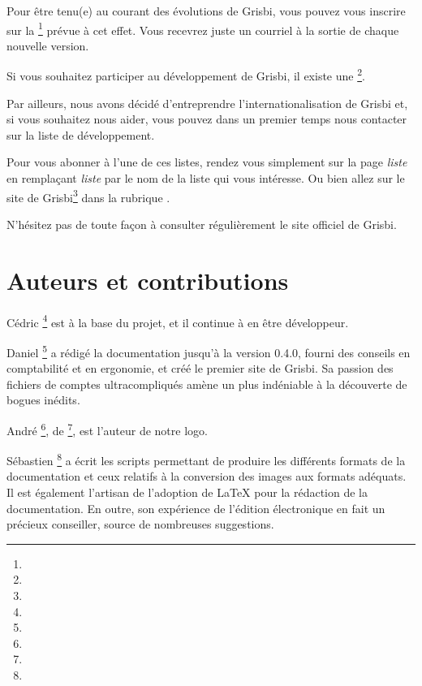 Pour être tenu(e) au courant des évolutions de Grisbi, vous pouvez vous inscrire 
sur la \footnote{\urlListInfoEmail{}} prévue à cet effet. 
Vous recevrez juste un courriel à la sortie de chaque nouvelle version.

Si vous souhaitez participer au développement de Grisbi, il existe une \footnote{\urlListDevelEmail{}}.

Par ailleurs, nous avons décidé d'entreprendre l'internationalisation de Grisbi
et, si vous souhaitez nous aider, vous pouvez dans un premier temps nous contacter sur la liste de développement.

Pour vous abonner à l'une de ces listes, rendez vous simplement sur la page
\urlListSF{}\emph{liste} en remplaçant \emph{liste} par le nom de la liste qui vous intéresse. Ou bien allez sur le site de {Grisbi}\footnote{\urlGrisbi{}} dans la rubrique .

N'hésitez pas de toute façon à consulter régulièrement le site officiel de Grisbi.

\newpage


\section{Auteurs et contributions\label{introduction-authors}}


{Cédric }\footnote{\urlCedricAugerEmail{}} est à la base du projet, et il continue à en être développeur.

{Daniel }\footnote{\urlDanielCartronEmail{}} a rédigé la documentation jusqu'à la version 0.4.0, fourni des conseils en comptabilité et en ergonomie, et créé le premier site de Grisbi. Sa passion des fichiers de
comptes ultracompliqués amène un plus indéniable à la découverte de bogues inédits.

{André }\footnote{\urlAndrePascualEmail{}}, de
\footnote{\urlLinuxGraphic{}}, est l'auteur de notre logo.

{Sébastien }\footnote{\urlSebastienBlondeelEmail{}} a écrit les scripts permettant de produire les différents formats de la documentation et ceux relatifs à la conversion des images aux formats adéquats. Il est également l'artisan de l'adoption de \gls{LaTeX} pour la rédaction de la documentation. En outre, son expérience de l'édition électronique en fait un précieux conseiller, source de nombreuses suggestions.

